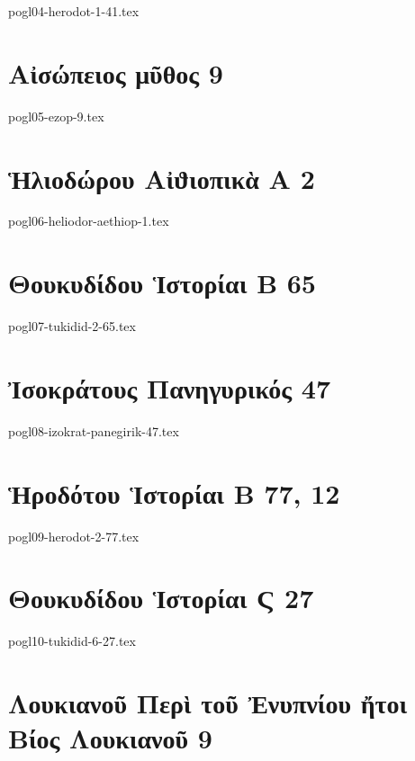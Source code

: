 \documentclass[a4paper,12pt,twoside]{report}
\begin{document}
{pogl04-herodot-1-41.tex}

\chapter[Αἰσώπειος μῦθος 9]{\textgreek[variant=ancient]{Αἰσώπειος μῦθος} 9}

{pogl05-ezop-9.tex}

\chapter[Ἡλιοδώρου Αἰϑιοπικὰ Α]{\textgreek[variant=ancient]{Ἡλιοδώρου Αἰϑιοπικὰ Α} 2}

{pogl06-heliodor-aethiop-1.tex}

\chapter[Θουκυδίδου Ἱστορίαι Β]{\textgreek[variant=ancient]{Θουκυδίδου Ἱστορίαι Β} 65}

{pogl07-tukidid-2-65.tex}

\chapter[Ἰσοκράτους Πανηγυρικός ]{\textgreek[variant=ancient]{Ἰσοκράτους Πανηγυρικός} 47}

{pogl08-izokrat-panegirik-47.tex}

\chapter[Ἡροδότου Ἱστορίαι Β]{\textgreek[variant=ancient]{Ἡροδότου Ἱστορίαι Β} 77, 12}

{pogl09-herodot-2-77.tex}

\chapter[Θουκυδίδου Ἱστορίαι Ϛ 27]{\textgreek[variant=ancient]{Θουκυδίδου Ἱστορίαι Ϛ} 27}

{pogl10-tukidid-6-27.tex}

\chapter[Λουκιανοῦ Περὶ τοῦ Ἐνυπνίου]{\textgreek[variant=ancient]{Λουκιανοῦ Περὶ τοῦ Ἐνυπνίου ἤτοι Βίος Λουκιανοῦ} 9}
\end{document}
